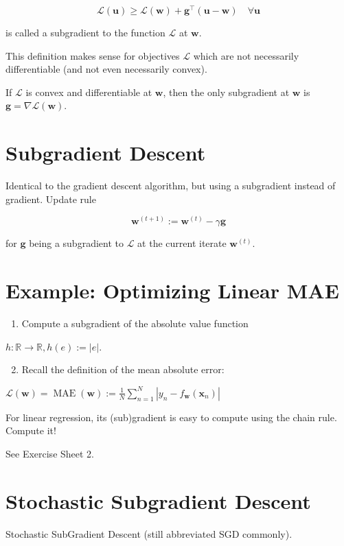 \documentclass[10pt]{article}
\begin{document}
$$
\mathcal{L}(\mathbf{u}) \geq \mathcal{L}(\mathbf{w})+\mathbf{g}^{\top}(\mathbf{u}-\mathbf{w}) \quad \forall \mathbf{u}
$$

is called a subgradient to the function $\mathcal{L}$ at $\mathbf{w}$.

This definition makes sense for objectives $\mathcal{L}$ which are not necessarily differentiable (and not even necessarily convex).

If $\mathcal{L}$ is convex and differentiable at $\mathbf{w}$, then the only subgradient at $\mathbf{w}$ is $\mathbf{g}=\nabla \mathcal{L}(\mathbf{w})$.

\section*{Subgradient Descent}
Identical to the gradient descent algorithm, but using a subgradient instead of gradient. Update rule

$$
\mathbf{w}^{(t+1)}:=\mathbf{w}^{(t)}-\gamma \mathbf{g}
$$

for $\mathbf{g}$ being a subgradient to $\mathcal{L}$ at the current iterate $\mathbf{w}^{(t)}$.

\section*{Example: Optimizing Linear MAE}
\begin{enumerate}
  \item Compute a subgradient of the absolute value function
\end{enumerate}

$h: \mathbb{R} \rightarrow \mathbb{R}, h(e):=|e|$.

\begin{enumerate}
  \setcounter{enumi}{1}
  \item Recall the definition of the mean absolute error:
\end{enumerate}

$\mathcal{L}(\mathbf{w})=\operatorname{MAE}(\mathbf{w}):=\frac{1}{N} \sum_{n=1}^{N}\left|y_{n}-f_{\mathbf{w}}\left(\mathbf{x}_{n}\right)\right|$

For linear regression, its (sub)gradient is easy to compute using the chain rule. Compute it!

See Exercise Sheet 2.

\section*{Stochastic Subgradient Descent}
Stochastic SubGradient Descent (still abbreviated SGD commonly).
\end{document}

